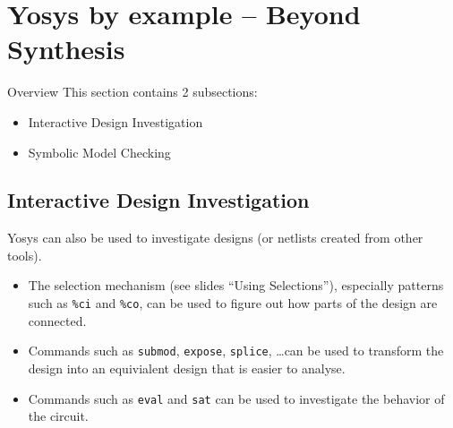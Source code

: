 
\section{Yosys by example -- Beyond Synthesis}

\begin{frame}
\sectionpage
\end{frame}

\begin{frame}{Overview}
This section contains 2 subsections:
\begin{itemize}
\item Interactive Design Investigation
\item Symbolic Model Checking
\end{itemize}
\end{frame}


\subsection{Interactive Design Investigation}

\begin{frame}
\subsectionpage
\subsectionpagesuffix
\end{frame}

\begin{frame}{\subsecname}
Yosys can also be used to investigate designs (or netlists created
from other tools).

\begin{itemize}
\item
The selection mechanism (see slides ``Using Selections''), especially patterns such
as {\tt \%ci} and {\tt \%co}, can be used to figure out how parts of the design
are connected.

\item
Commands such as {\tt submod}, {\tt expose}, {\tt splice}, \dots can be used
to transform the design into an equivialent design that is easier to analyse.

\item
Commands such as {\tt eval} and {\tt sat} can be used to investigate the
behavior of the circuit.
\end{itemize}
\end{frame}


